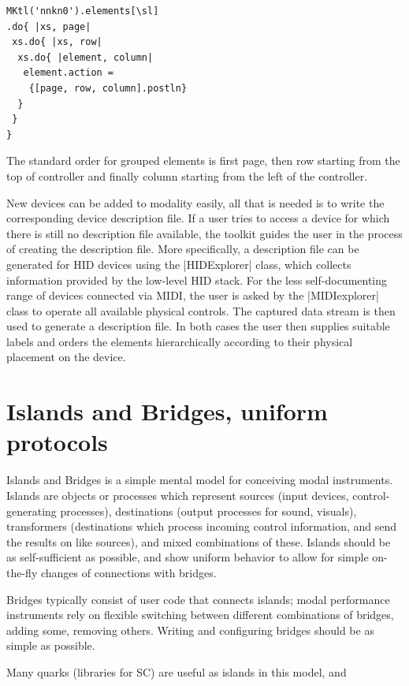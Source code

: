 \documentclass{article}
\begin{document}
\begin{Verbatim}
MKtl('nnkn0').elements[\sl]
.do{ |xs, page|
 xs.do{ |xs, row|
  xs.do{ |element, column|
   element.action = 
    {[page, row, column].postln}
  }
 }
}
\end{Verbatim}

The standard order for grouped elements is first page, then row starting from the top of controller and finally column starting from the left of the controller.

New devices can be added to modality easily, all that is needed is to write the corresponding device description file. 
If a user tries to access a device for which there is still no description file available, the toolkit guides the user in the process of creating the description file. 
More specifically, a description file can be generated for HID devices using the |HIDExplorer| class, which collects information provided by the low-level HID stack. 
For the less self-documenting range of devices connected via MIDI, the user is asked by the |MIDIexplorer| class to operate all available physical controls. 
The captured data stream is then used to generate a description file.
In both cases the user then supplies suitable labels and orders the elements hierarchically according to their physical placement on the device.

\section{Islands and Bridges, uniform protocols}
\label{sec:islands_and_bridges_uniform_protocols}
Islands and Bridges is a simple mental model for conceiving modal instruments. 
Islands are objects or processes which represent sources (input devices, control-generating processes), destinations (output processes for sound, visuals), transformers (destinations which process incoming control information, and send the results on like sources), and mixed combinations of these. 
Islands should be as self-sufficient as possible, and show uniform behavior to allow for simple on-the-fly changes of connections with bridges.

Bridges typically consist of user code that connects islands; modal performance instruments rely on flexible switching between different combinations of bridges, adding some, removing others. Writing and configuring bridges should be as simple as possible. 

Many quarks (libraries for SC) are useful as islands in this model, and 
\end{document}
